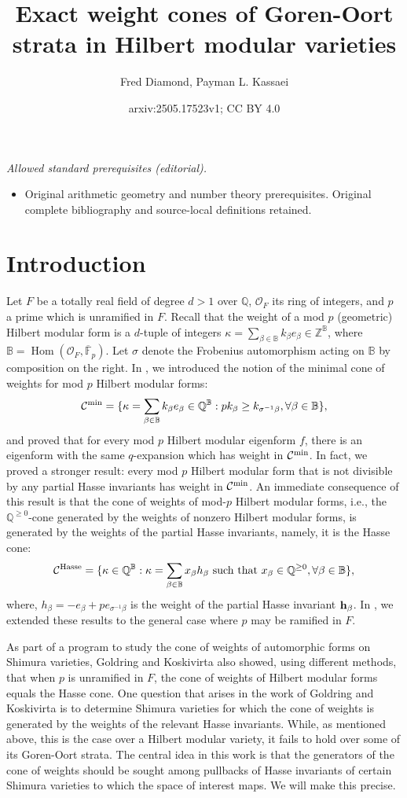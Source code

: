 \documentclass[11pt,pdflatex]{amsart}
\title{Exact weight cones of Goren-Oort strata in Hilbert modular varieties}
\author{Fred Diamond, Payman L. Kassaei}
\date{arxiv:2505.17523v1; CC BY 4.0}
\theoremstyle{plain}
\theoremstyle{definition}
\newcommand{\FF}{\mathbf{F}}
\newcommand{\QQ}{\mathbf{Q}}
\newcommand{\ZZ}{\mathbf{Z}}
\newcommand{\Fpbar}{{\overline{\FF}_p}}
\theoremstyle{plain}
\theoremstyle{definition}
\theoremstyle{remark}
\numberwithin{equation}{section}
\numberwithin{figure}{section} \numberwithin{table}{subsection}
\newcommand{\Hom}{{\operatorname{Hom}}}
\newcommand{\calC}{{\mathcal{C}}}
\newcommand{\calO}{{\mathcal{O}}}
\def\BB{\mathbb{B}}
\def\FF{\mathbb{F}}
\def\QQ{\mathbb{Q}}
\def\ZZ{\mathbb{Z}}
\begin{document}
\maketitle
\noindent\textit{Allowed standard prerequisites (editorial).}\begin{itemize}
\item Original arithmetic geometry and number theory prerequisites. Original complete bibliography and source-local definitions retained.
\end{itemize}\medskip
\section{Introduction}
Let $F$ be a totally real field of degree $d>1$ over $\QQ$, $\calO_F$ its ring of integers, and $p$ a prime which is unramified in $F$. Recall that the weight of a mod $p$ (geometric) Hilbert modular form is a $d$-tuple of integers $\kappa=\sum_{\beta \in \BB} k_\beta e_\beta \in \ZZ^\BB$, where $\BB=\Hom(\calO_F,\Fpbar)$. Let $\sigma$ denote the Frobenius automorphism acting on $\BB$ by composition on the right. In \cite{DK1}, we introduced the notion of the minimal cone of weights for mod $p$ Hilbert modular forms:
\[
\calC^{\rm min}=\{\kappa=\sum_{\beta \in \BB} k_\beta e_\beta \in \QQ^\BB: pk_\beta \geq k_{\sigma^{-1}\beta}, \forall \beta \in \BB\},
\]
and proved that for every mod $p$ Hilbert modular eigenform $f$, there is an eigenform with the same $q$-expansion which has   weight in $\calC^{\rm min}$. In fact, we proved a stronger result:   every mod $p$ Hilbert modular form that is not divisible by any partial Hasse invariants has weight in  $\calC^{\rm min}$.  An immediate consequence of this result is that the cone of weights of mod-$p$ Hilbert modular forms, i.e., the $\QQ^{\geq 0}$-cone generated by the weights of nonzero Hilbert modular forms, is generated by the weights of the partial Hasse invariants, namely, it is the Hasse cone: 
\[
\calC^{\rm Hasse}=\{\kappa\in \QQ^\BB: \kappa= \sum_{\beta \in \BB} x_\beta h_\beta\ {\rm such\ that}\ x_\beta \in \QQ^{\geq0},  \forall \beta\in \BB\},
\]
where, $h_\beta =-e_\beta + p e_{\sigma^{-1}\beta}$ is the weight of the partial Hasse invariant ${\bf h}_\beta$. In \cite{DK2}, we extended these results to the general case where $p$ may be ramified in $F$. 

As part of a program to study the cone of weights of automorphic forms on Shimura varieties, Goldring and Koskivirta \cite{GK} also showed, using different methods,  that when $p$ is unramified in $F$, the cone of weights of Hilbert modular forms equals the Hasse cone. One question that arises in the work of Goldring and Koskivirta is to determine Shimura varieties for which the cone of weights is generated by the weights of the relevant Hasse invariants. While, as mentioned above, this is the case over a Hilbert modular variety, it fails to hold over some of its Goren-Oort strata. The central idea in this work is that the generators of the cone of weights should be sought among pullbacks of Hasse invariants of certain Shimura varieties to which the space of interest maps. We will make this precise. 
\end{document}

